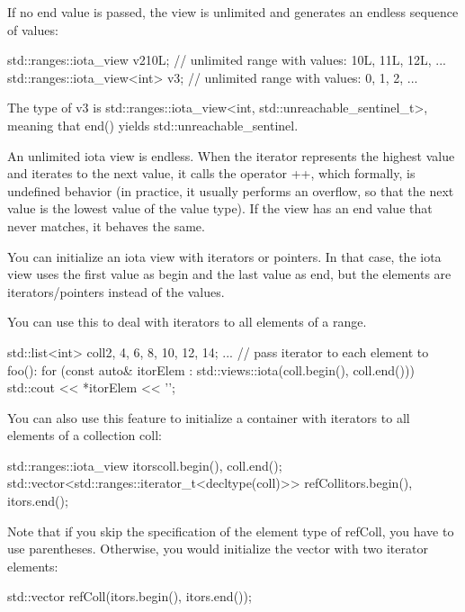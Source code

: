 If no end value is passed, the view is unlimited and generates an endless sequence of values:

\begin{cpp}
std::ranges::iota_view v2{10L}; // unlimited range with values: 10L, 11L, 12L, ...
std::ranges::iota_view<int> v3; // unlimited range with values: 0, 1, 2, ...
\end{cpp}

The type of v3 is std::ranges::iota\_view<int, std::unreachable\_sentinel\_t>, meaning that end() yields std::unreachable\_sentinel.

An unlimited iota view is endless. When the iterator represents the highest value and iterates to the next value, it calls the operator ++, which formally, is undefined behavior (in practice, it usually performs an overflow, so that the next value is the lowest value of the value type). If the view has an end value that never matches, it behaves the same.


You can initialize an iota view with iterators or pointers. In that case, the iota view uses the first value as begin and the last value as end, but the elements are iterators/pointers instead of the values.

You can use this to deal with iterators to all elements of a range.

\begin{cpp}
std::list<int> coll{2, 4, 6, 8, 10, 12, 14};
...
// pass iterator to each element to foo():
for (const auto& itorElem : std::views::iota(coll.begin(), coll.end())) {
	std::cout << *itorElem << '\n';
}
\end{cpp}

You can also use this feature to initialize a container with iterators to all elements of a collection coll:

\begin{cpp}
std::ranges::iota_view itors{coll.begin(), coll.end()};
std::vector<std::ranges::iterator_t<decltype(coll)>> refColl{itors.begin(),
	itors.end()};
\end{cpp}

Note that if you skip the specification of the element type of refColl, you have to use parentheses. Otherwise, you would initialize the vector with two iterator elements:

\begin{cpp}
std::vector refColl(itors.begin(), itors.end());
\end{cpp}

